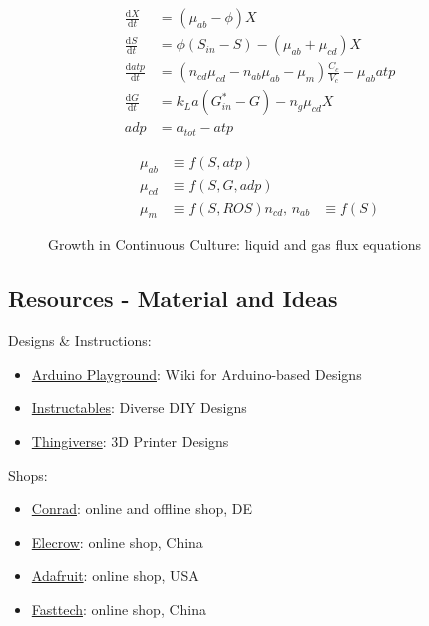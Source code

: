 \documentclass[12pt,a4paper]{scrartcl}
\begin{document}
\begin{figure}
\begin{minipage}{.5\textwidth}
  \begin{equation*}
    \label{eqn:ancat}
    \begin{aligned}
      \frac{\text{d}X}{\text{d}t} &= (\mu_{ab} - \phi) X  \\
      \frac{\text{d}S}{\text{d}t} &= \phi (S_{in} - S)-(\mu_{ab} + \mu_{cd}) X\\  
      \frac{\text{d}atp}{\text{d}t} &= (n_{cd} \mu_{cd} - n_{ab} \mu_{ab} - \mu_{m})\frac{C_c}{V_c} - \mu_{ab} atp\\
      \frac{\text{d}G}{\text{d}t} &= k_La (G_{in}^* - G) - n_{g} \mu_{cd} X\\
      adp & = a_{tot} - atp
    \end{aligned}
  \end{equation*}
\end{minipage}
\begin{minipage}{.5\textwidth}
  \begin{equation*}
    \begin{aligned}
      \mu_{ab} &\equiv f(S,atp)\\
      \mu_{cd} &\equiv f(S,G,adp)\\
      \mu_m &\equiv f(S,ROS)
      n_{cd},\,n_{ab} &\equiv f(S) 
    \end{aligned}
  \end{equation*}
\end{minipage}
\caption{Growth in Continuous Culture: liquid and gas flux equations} 
\end{figure}

\newpage
\subsection{Resources - Material and Ideas}

Designs \& Instructions:
\begin{itemize}
\item \href{http://playground.arduino.cc/}{Arduino Playground}: Wiki for Arduino-based Designs
\item \href{http://www.instructables.com/}{Instructables}: Diverse DIY Designs
\item \href{https://www.thingiverse.com/}{Thingiverse}: 3D Printer Designs
\end{itemize}
Shops:
\begin{itemize}
\item \href{https://www.conrad.de/de/bauelemente-t04.html}{Conrad}: online and offline shop, DE
\item \href{http://www.elecrow.com/}{Elecrow}: online shop, China
\item \href{https://www.adafruit.com/}{Adafruit}: online shop, USA
\item \href{https://www.fasttech.com/}{Fasttech}: online shop, China
\end{itemize}
\end{document}
